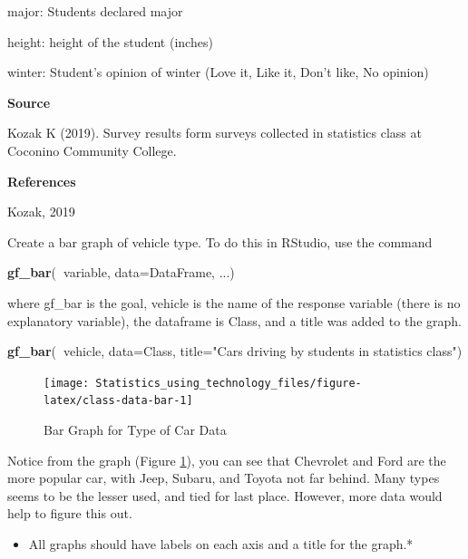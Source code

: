 \documentclass[
]{book}
\newenvironment{Shaded}{\begin{snugshade}}{\end{snugshade}}
\newcommand{\DataTypeTok}[1]{\textcolor[rgb]{0.13,0.29,0.53}{#1}}
\newcommand{\KeywordTok}[1]{\textcolor[rgb]{0.13,0.29,0.53}{\textbf{#1}}}
\newcommand{\NormalTok}[1]{#1}
\newcommand{\OperatorTok}[1]{\textcolor[rgb]{0.81,0.36,0.00}{\textbf{#1}}}
\newcommand{\StringTok}[1]{\textcolor[rgb]{0.31,0.60,0.02}{#1}}
\providecommand{\tightlist}{%
  \setlength{\itemsep}{0pt}\setlength{\parskip}{0pt}}
\begin{document}
major: Students declared major

height: height of the student (inches)

winter: Student's opinion of winter (Love it, Like it, Don't like, No opinion)

\textbf{Source}

Kozak K (2019). Survey results form surveys collected in statistics class at Coconino Community College.

\textbf{References}

Kozak, 2019

Create a bar graph of vehicle type. To do this in RStudio, use the command

\begin{Shaded}
\begin{Highlighting}[]
\KeywordTok{gf_bar}\NormalTok{(}\OperatorTok{~}\NormalTok{variable, }\DataTypeTok{data=}\NormalTok{DataFrame, ...)}
\end{Highlighting}
\end{Shaded}

where gf\_bar is the goal, vehicle is the name of the response variable (there is no explanatory variable), the dataframe is Class, and a title was added to the graph.



\begin{Shaded}
\begin{Highlighting}[]
\KeywordTok{gf_bar}\NormalTok{(}\OperatorTok{~}\NormalTok{vehicle, }\DataTypeTok{data=}\NormalTok{Class, }\DataTypeTok{title=}\StringTok{"Cars driving by students in }
\StringTok{       statistics class"}\NormalTok{)}
\end{Highlighting}
\end{Shaded}

\begin{figure}
\texttt{[image: Statistics\_using\_technology\_files/figure-latex/class-data-bar-1]} \caption{Bar Graph for Type of Car Data}\label{fig:class-data-bar}
\end{figure}

Notice from the graph (Figure \ref{fig:class-data-bar}), you can see that Chevrolet and Ford are the more popular car, with Jeep, Subaru, and Toyota not far behind. Many types seems to be the lesser used, and tied for last place. However, more data would help to figure this out.

\begin{itemize}
\tightlist
\item
  All graphs should have labels on each axis and a title for the graph.*
\end{itemize}
\end{document}
